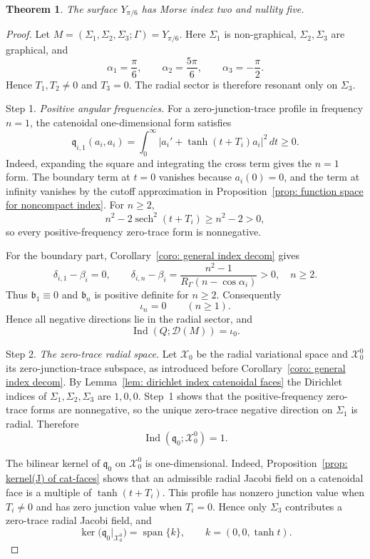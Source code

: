 \documentclass[10pt,a4paper]{amsart}
\newtheorem{thm}{Theorem}
\begin{document}
\begin{thm}
The surface $Y_{\pi/6}$ has Morse index two and nullity five.
\end{thm}

\begin{proof}
Let $M=(\Sigma_1,\Sigma_2,\Sigma_3;\Gamma)=Y_{\pi/6}$. Here $\Sigma_1$ is non-graphical, $\Sigma_2,\Sigma_3$ are graphical, and
\[
\alpha_1=\frac{\pi}{6},\qquad
\alpha_2=\frac{5\pi}{6},\qquad
\alpha_3=-\frac{\pi}{2}.
\]
Hence $T_1,T_2\neq0$ and $T_3=0$. The radial sector is therefore resonant only on $\Sigma_3$.

\medskip
\noindent Step 1. \emph{Positive angular frequencies.}
For a zero-junction-trace profile in frequency $n=1$, the catenoidal one-dimensional form satisfies
\[
\mathfrak q_{i,1}(a_i,a_i)
=\int_0^\infty\left|a_i'+\tanh(t+T_i)a_i\right|^2\,dt\geq0.
\]
Indeed, expanding the square and integrating the cross term gives the $n=1$ form. The boundary term at $t=0$ vanishes because $a_i(0)=0$, and the term at infinity vanishes by the cutoff approximation in Proposition~\ref{prop: function space for noncompact index}. For $n\ge2$,
\[
n^2-2\operatorname{sech}^2(t+T_i)\ge n^2-2>0,
\]
so every positive-frequency zero-trace form is nonnegative.

For the boundary part, Corollary~\ref{coro: general index decom} gives
\[
\delta_{i,1}-\beta_i=0,
\qquad
\delta_{i,n}-\beta_i
=\frac{n^2-1}{R_\Gamma(n-\cos\alpha_i)}>0,
\quad n\ge2.
\]
Thus $\mathfrak b_1\equiv0$ and $\mathfrak b_n$ is positive definite for $n\ge2$. Consequently
\[
\iota_n=0\qquad(n\ge1).
\]
Hence all negative directions lie in the radial sector, and
\[
\operatorname{Ind}(Q;\mathcal D(M))=\iota_0.
\]

\medskip
\noindent Step 2. \emph{The zero-trace radial space.}
Let $\mathcal X_0$ be the radial variational space and $\mathcal X_0^0$ its zero-junction-trace subspace, as introduced before Corollary~\ref{coro: general index decom}. By Lemma~\ref{lem: dirichlet index catenoidal faces} the Dirichlet indices of $\Sigma_1,\Sigma_2,\Sigma_3$ are $1,0,0$. Step~1 shows that the positive-frequency zero-trace forms are nonnegative, so the unique zero-trace negative direction on $\Sigma_1$ is radial. Therefore
\[
\operatorname{Ind}(\mathfrak q_0;\mathcal X_0^0)=1.
\]

The bilinear kernel of $\mathfrak q_0$ on $\mathcal X_0^0$ is one-dimensional. Indeed, Proposition~\ref{prop: kernel(J) of cat-faces} shows that an admissible radial Jacobi field on a catenoidal face is a multiple of $\tanh(t+T_i)$. This profile has nonzero junction value when $T_i\neq0$ and has zero junction value when $T_i=0$. Hence only $\Sigma_3$ contributes a zero-trace radial Jacobi field, and
\[
\ker\bigl(\mathfrak q_0|_{\mathcal X_0^0}\bigr)
=\operatorname{span}\{k\},
\qquad
k=(0,0,\tanh t).
\]


\end{proof}
\end{document}
